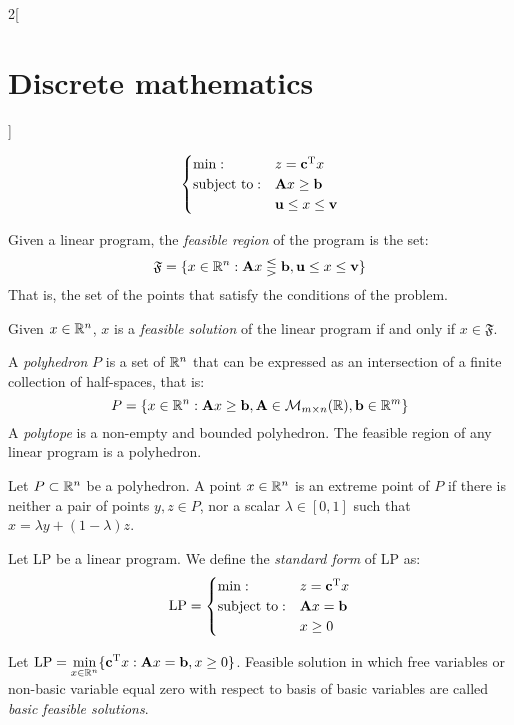 \documentclass[../../../main_math.tex]{subfiles}
\begin{document}
\begin{multicols}{2}[\section{Discrete mathematics}]
\begin{definition}
$$      \begin{cases}
        \min:              & z={\boldsymbol{\mathrm{c}}}^{\mathrm{T}}x   \\
        \text{subject to}: & \boldsymbol{\mathrm{A}}x\geq \boldsymbol{\mathrm{b}}      \\
                           & \boldsymbol{\mathrm{u}}\leq x\leq \boldsymbol{\mathrm{v}}
      \end{cases}$$
  \end{definition}
  \begin{definition}
    Given a linear program, the \emph{feasible region} of the program is the set: $$\mathfrak{F}=\{x\in\mathbb{R} ^n:\boldsymbol{\mathrm{A}}x\lesseqgtr \boldsymbol{\mathrm{b}},\boldsymbol{\mathrm{u}}\leq x\leq \boldsymbol{\mathrm{v}}\}$$ That is, the set of the points that satisfy the conditions of the problem.
  \end{definition}
  \begin{proposition}
    Given $x\in\mathbb{R} ^n$, $x$ is a \emph{feasible solution} of the linear program if and only if $x\in\mathfrak{F}$.
  \end{proposition}
  \begin{definition}
    A \emph{polyhedron} $P$ is a set of $\mathbb{R} ^n$ that can be expressed as an intersection of a finite collection of half-spaces, that is: $$P=\{x\in\mathbb{R} ^n:\boldsymbol{\mathrm{A}}x\geq \boldsymbol{\mathrm{b}}, \boldsymbol{\mathrm{A}}\in\mathcal{M}_{m\times n}(\mathbb{R} ),\boldsymbol{\mathrm{b}}\in\mathbb{R} ^m\}$$ A \emph{polytope} is a non-empty and bounded polyhedron. The feasible region of any linear program is a polyhedron.
  \end{definition}
  \begin{definition}
    Let $P\subset\mathbb{R} ^n$ be a polyhedron. A point $x\in\mathbb{R} ^n$ is an extreme point of $P$ if there is neither a pair of points $y,z\in P$, nor a scalar $\lambda\in[0,1]$ such that $x=\lambda y+(1-\lambda)z$.
  \end{definition}
  \begin{definition}
    Let LP be a linear program. We define the \emph{standard form} of LP as:
    $$\text{LP}=
      \begin{cases}
        \min:              & z={\boldsymbol{\mathrm{c}}}^{\mathrm{T}}x \\
        \text{subject to}: & \boldsymbol{\mathrm{A}}x=\boldsymbol{\mathrm{b}}        \\
                           & x\geq 0
      \end{cases}$$
  \end{definition}
  \begin{definition}
    Let $\displaystyle \text{LP}=\min_{x\in\mathbb{R} ^n}\{{\boldsymbol{\mathrm{c}}}^{\mathrm{T}}x:\boldsymbol{\mathrm{A}}x=\boldsymbol{\mathrm{b}},x\geq 0\}$. Feasible solution in which free variables or non-basic variable equal zero with respect to basis of basic variables are called \emph{basic feasible solutions}.

\end{definition}
\end{multicols}
\end{document}
